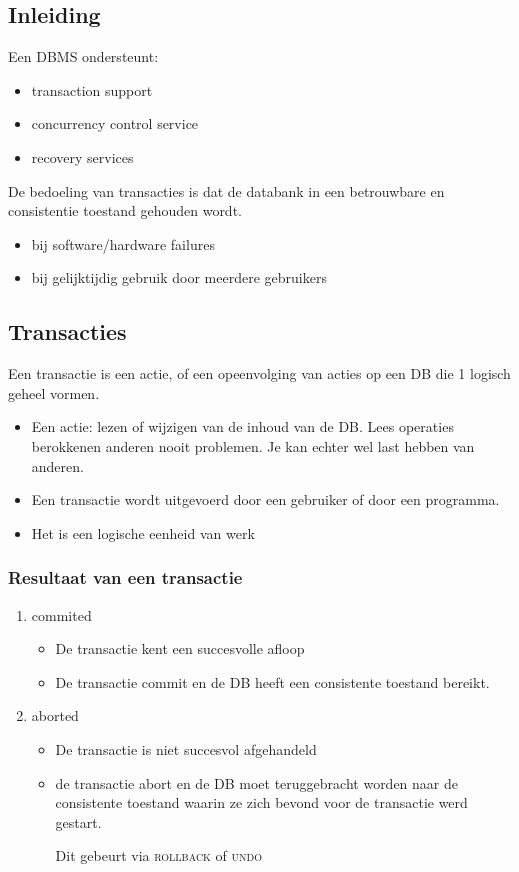\documentclass[a4paper,12pt]{article}
\begin{document}
\subsection{Inleiding}
Een DBMS ondersteunt:
\begin{itemize}
\item transaction support
\item concurrency control service
\item recovery services
\end{itemize}

De bedoeling van transacties is dat de databank in een betrouwbare en consistentie toestand gehouden wordt.
\begin{itemize}
\item bij software/hardware failures
\item bij gelijktijdig gebruik door meerdere gebruikers
\end{itemize}

\subsection{Transacties}
Een transactie is een actie, of een opeenvolging van acties op een DB die 1 logisch geheel vormen.
\begin{itemize}
\item Een actie: lezen of wijzigen van de inhoud van de DB. Lees operaties berokkenen anderen nooit problemen. Je kan echter wel last hebben van anderen.
\item Een transactie wordt uitgevoerd door een gebruiker of door een programma.
\item Het is een logische eenheid van werk
\end{itemize}
\subsubsection{Resultaat van een transactie}
\begin{enumerate}
\item commited
	\begin{itemize}
	\item De transactie kent een succesvolle afloop
	\item De transactie commit en de DB heeft een consistente toestand bereikt.
	\end{itemize}
\item aborted
	\begin{itemize}
	\item De transactie is niet succesvol afgehandeld
	\item de transactie abort en de DB moet teruggebracht worden naar de consistente toestand waarin ze zich bevond voor de transactie werd gestart.
	
Dit gebeurt via \textsc{rollback} of \textsc{undo}
	\end{itemize}
\end{enumerate}
\end{document}
